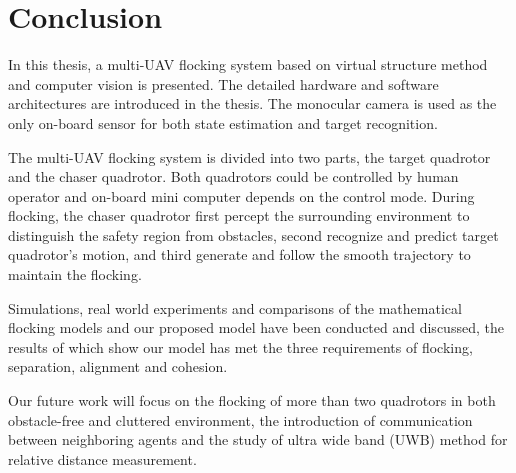 \chapter{Conclusion}\label{conclusion}

In this thesis, a multi-UAV flocking system based on virtual structure method and computer vision is presented. The detailed hardware and software architectures are introduced in the thesis. The monocular camera is used as the only on-board sensor for both state estimation and target recognition.

The multi-UAV flocking system is divided into two parts, the target quadrotor and the chaser quadrotor. Both quadrotors could be controlled by human operator and on-board mini computer depends on the control mode. During flocking, the chaser quadrotor first percept the surrounding environment to distinguish the safety region from obstacles, second recognize and predict target quadrotor's motion, and third generate and follow the smooth trajectory to maintain the flocking.

Simulations, real world experiments and comparisons of the mathematical flocking models and our proposed model have been conducted and discussed, the results of which show our model has met the three requirements of flocking, separation, alignment and cohesion.

Our future work will focus on the flocking of more than two quadrotors in both obstacle-free and cluttered environment, the introduction of communication between neighboring agents and the study of ultra wide band (UWB) method for relative distance measurement. 